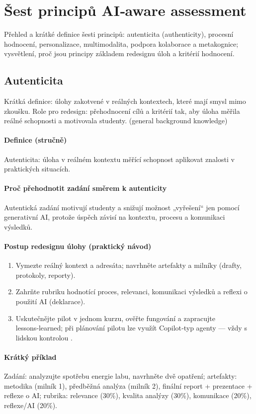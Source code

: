 \documentclass{report}%
\begin{document}
%
\section{Šest principů AI‑aware assessment}%
Přehled a krátké definice šesti principů: autenticita (authenticity), procesní hodnocení, personalizace, multimodalita, podpora kolaborace a metakognice; vysvětlení, proč jsou principy základem redesignu úloh a kritérií hodnocení.%
\subsection{Autenticita}%
Krátká definice: úlohy zakotvené v reálných kontextech, které mají smysl mimo zkoušku. Role pro redesign: přehodnocení cílů a kritérií tak, aby úloha měřila reálné schopnosti a motivovala studenty. (general background knowledge)%


%
\paragraph{Definice (stručně)} 
Autenticita: úloha v reálném kontextu měřící schopnost aplikovat znalosti v praktických situacích.

\paragraph{Proč přehodnotit zadání směrem k autenticity}
Autentická zadání motivují studenty a snižují možnost „vyřešení“ jen pomocí generativní AI, protože úspěch závisí na kontextu, procesu a komunikaci výsledků.

\paragraph{Postup redesignu úlohy (praktický návod)}
\begin{enumerate}
  \item Vymezte reálný kontext a adresáta; navrhněte artefakty a milníky (drafty, protokoly, reporty).
  \item Zahrňte rubriku hodnotící proces, relevanci, komunikaci výsledků a reflexi o použití AI (deklarace).
  \item Uskutečnějte pilot v jednom kurzu, ověřte fungování a zapracujte lessons‑learned; při plánování pilotu lze využít Copilot‑typ agenty — vždy s lidskou kontrolou \cite{kb_ai_101_tipu_pdf_04e4a115_page_48_1}.
\end{enumerate}

\paragraph{Krátký příklad} Zadání: analyzujte spotřebu energie labu, navrhněte dvě opatření; artefakty: metodika (milník 1), předběžná analýza (milník 2), finální report + prezentace + reflexe o AI; rubrika: relevance (30\%), kvalita analýzy (30\%), komunikace (20\%), reflexe/AI (20\%).
\end{document}
